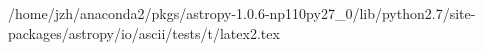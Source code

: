 /home/jzh/anaconda2/pkgs/astropy-1.0.6-np110py27_0/lib/python2.7/site-packages/astropy/io/ascii/tests/t/latex2.tex